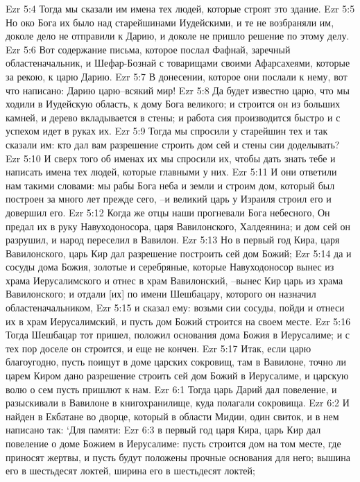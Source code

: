 Ezr 5:4  Тогда мы сказали им имена тех людей, которые строят это здание.
Ezr 5:5  Но око Бога их было над старейшинами Иудейскими, и те не возбраняли им, доколе дело не отправили к Дарию, и доколе не пришло решение по этому делу.
Ezr 5:6  Вот содержание письма, которое послал Фафнай, заречный областеначальник, и Шефар-Бознай с товарищами своими Афарсахеями, которые за рекою, к царю Дарию.
Ezr 5:7  В донесении, которое они послали к нему, вот что написано: Дарию царю--всякий мир!
Ezr 5:8  Да будет известно царю, что мы ходили в Иудейскую область, к дому Бога великого; и строится он из больших камней, и дерево вкладывается в стены; и работа сия производится быстро и с успехом идет в руках их.
Ezr 5:9  Тогда мы спросили у старейшин тех и так сказали им: кто дал вам разрешение строить дом сей и стены сии доделывать?
Ezr 5:10  И сверх того об именах их мы спросили их, чтобы дать знать тебе и написать имена тех людей, которые главными у них.
Ezr 5:11  И они ответили нам такими словами: мы рабы Бога неба и земли и строим дом, который был построен за много лет прежде сего, --и великий царь у Израиля строил его и довершил его.
Ezr 5:12  Когда же отцы наши прогневали Бога небесного, Он предал их в руку Навуходоносора, царя Вавилонского, Халдеянина; и дом сей он разрушил, и народ переселил в Вавилон.
Ezr 5:13  Но в первый год Кира, царя Вавилонского, царь Кир дал разрешение построить сей дом Божий;
Ezr 5:14  да и сосуды дома Божия, золотые и серебряные, которые Навуходоносор вынес из храма Иерусалимского и отнес в храм Вавилонский, --вынес Кир царь из храма Вавилонского; и отдали [их] по имени Шешбацару, которого он назначил областеначальником,
Ezr 5:15  и сказал ему: возьми сии сосуды, пойди и отнеси их в храм Иерусалимский, и пусть дом Божий строится на своем месте.
Ezr 5:16  Тогда Шешбацар тот пришел, положил основания дома Божия в Иерусалиме; и с тех пор доселе он строится, и еще не кончен.
Ezr 5:17  Итак, если царю благоугодно, пусть поищут в доме царских сокровищ, там в Вавилоне, точно ли царем Киром дано разрешение строить сей дом Божий в Иерусалиме, и царскую волю о сем пусть пришлют к нам.
Ezr 6:1  Тогда царь Дарий дал повеление, и разыскивали в Вавилоне в книгохранилище, куда полагали сокровища.
Ezr 6:2  И найден в Екбатане во дворце, который в области Мидии, один свиток, и в нем написано так: `Для памяти:
Ezr 6:3  в первый год царя Кира, царь Кир дал повеление о доме Божием в Иерусалиме: пусть строится дом на том месте, где приносят жертвы, и пусть будут положены прочные основания для него; вышина его в шестьдесят локтей, ширина его в шестьдесят локтей;
